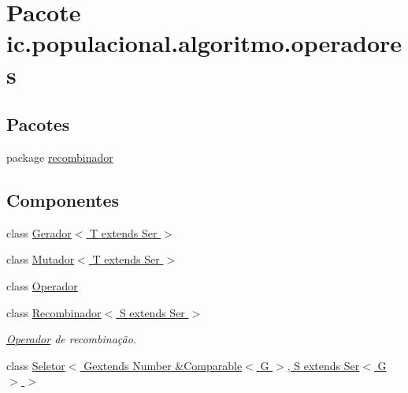 \hypertarget{namespaceic_1_1populacional_1_1algoritmo_1_1operadores}{\section{Pacote ic.\-populacional.\-algoritmo.\-operadores}
\label{namespaceic_1_1populacional_1_1algoritmo_1_1operadores}
}
\subsection*{Pacotes}
\begin{DoxyCompactItemize}
\item 
package \hyperlink{namespaceic_1_1populacional_1_1algoritmo_1_1operadores_1_1recombinador}{recombinador}
\end{DoxyCompactItemize}
\subsection*{Componentes}
\begin{DoxyCompactItemize}
\item 
class \hyperlink{classic_1_1populacional_1_1algoritmo_1_1operadores_1_1_gerador_3_01_t_01extends_01_ser_01_4}{Gerador$<$ T extends Ser $>$}
\item 
class \hyperlink{classic_1_1populacional_1_1algoritmo_1_1operadores_1_1_mutador_3_01_t_01extends_01_ser_01_4}{Mutador$<$ T extends Ser $>$}
\item 
class \hyperlink{classic_1_1populacional_1_1algoritmo_1_1operadores_1_1_operador}{Operador}
\item 
class \hyperlink{classic_1_1populacional_1_1algoritmo_1_1operadores_1_1_recombinador_3_01_s_01extends_01_ser_01_4}{Recombinador$<$ S extends Ser $>$}
\begin{DoxyCompactList}\small\item\em \hyperlink{classic_1_1populacional_1_1algoritmo_1_1operadores_1_1_operador}{Operador} de recombinação. \end{DoxyCompactList}\item 
class \hyperlink{classic_1_1populacional_1_1algoritmo_1_1operadores_1_1_seletor_3_01_gextends_01_number_01_6_comp1cb45fdcf61805e0533898ec8098c80d}{Seletor$<$ Gextends Number \&\-Comparable$<$ G $>$, S extends Ser$<$ G $>$ $>$}
\end{DoxyCompactItemize}
